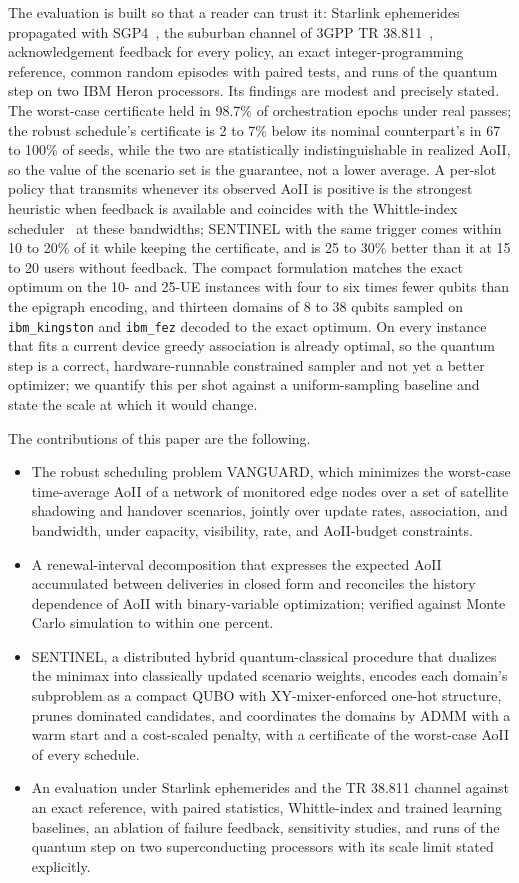 The evaluation is built so that a reader can trust it: Starlink ephemerides propagated with SGP4~\cite{Vallado2006},
the suburban channel of 3GPP TR 38.811~\cite{TR38811}, acknowledgement feedback for every policy, an exact
integer-programming reference, common random episodes with paired tests, and runs of the quantum step on two IBM
Heron processors. Its findings are modest and precisely stated. The worst-case certificate held in 98.7\% of
orchestration epochs under real passes; the robust schedule's certificate is 2 to 7\% below its nominal counterpart's
in 67 to 100\% of seeds, while the two are statistically indistinguishable in realized AoII, so the value of the
scenario set is the guarantee, not a lower average. A per-slot policy that transmits whenever its observed AoII is
positive is the strongest heuristic when feedback is available and coincides with the Whittle-index
scheduler~\cite{Whittle1988, Kadota2018} at these bandwidths; SENTINEL with the same trigger comes within 10 to 20\%
of it while keeping the certificate, and is 25 to 30\% better than it at 15 to 20 users without feedback. The compact
formulation matches the exact optimum on the 10- and 25-UE instances with four to six times fewer qubits than the
epigraph encoding, and thirteen domains of 8 to 38 qubits sampled on \texttt{ibm\_kingston} and \texttt{ibm\_fez}
decoded to the exact optimum. On every instance that fits a current device greedy association is already optimal, so
the quantum step is a correct, hardware-runnable constrained sampler and not yet a better optimizer; we quantify this
per shot against a uniform-sampling baseline and state the scale at which it would change.

The contributions of this paper are the following.
\begin{itemize}[leftmargin=13pt]
\item The robust scheduling problem VANGUARD, which minimizes the worst-case time-average AoII of a network of
monitored edge nodes over a set of satellite shadowing and handover scenarios, jointly over update rates,
association, and bandwidth, under capacity, visibility, rate, and AoII-budget constraints.
\item A renewal-interval decomposition that expresses the expected AoII accumulated between deliveries in closed form
and reconciles the history dependence of AoII with binary-variable optimization; verified against Monte Carlo
simulation to within one percent.
\item SENTINEL, a distributed hybrid quantum-classical procedure that dualizes the minimax into classically updated scenario weights,
encodes each domain's subproblem as a compact QUBO with XY-mixer-enforced one-hot structure, prunes dominated
candidates, and coordinates the domains by ADMM with a warm start and a cost-scaled penalty, with a certificate of
the worst-case AoII of every schedule.
\item An evaluation under Starlink ephemerides and the TR 38.811 channel against an exact reference, with paired
statistics, Whittle-index and trained learning baselines, an ablation of failure feedback, sensitivity studies, and
runs of the quantum step on two superconducting processors with its scale limit stated explicitly.
\end{itemize}


